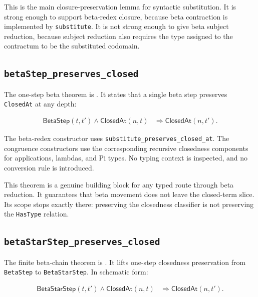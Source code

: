 This is the main closure-preservation lemma for syntactic substitution. It is
strong enough to support beta-redex closure, because beta contraction is
implemented by \texttt{substitute}. It is not strong enough to give beta
subject reduction, because subject reduction also requires the type assigned to
the contractum to be the substituted codomain.

\subsection{\texttt{betaStep\_preserves\_closed}}
\label{subsec:metacic-closure-preservation-audit-map-beta-step}

The one-step beta theorem is
.
It states that a single beta step preserves \texttt{ClosedAt} at any depth:

$$
\begin{aligned}
  \mathsf{BetaStep}(t,t')
  \wedge
  \mathsf{ClosedAt}(n,t)
  &\Rightarrow
  \mathsf{ClosedAt}(n,t').
\end{aligned}
$$

The beta-redex constructor uses
\texttt{substitute\_preserves\_closed\_at}. The congruence constructors use
the corresponding recursive closedness components for applications, lambdas,
and Pi types. No typing context is inspected, and no conversion rule is
introduced.

This theorem is a genuine building block for any typed route through beta
reduction. It guarantees that beta movement does not leave the closed-term
slice. Its scope stops exactly there: preserving the closedness classifier is
not preserving the \texttt{HasType} relation.

\subsection{\texttt{betaStarStep\_preserves\_closed}}
\label{subsec:metacic-closure-preservation-audit-map-beta-star-step}

The finite beta-chain theorem is
.
It lifts one-step closedness preservation from \texttt{BetaStep} to
\texttt{BetaStarStep}. In schematic form:

$$
\begin{aligned}
  \mathsf{BetaStarStep}(t,t')
  \wedge
  \mathsf{ClosedAt}(n,t)
  &\Rightarrow
  \mathsf{ClosedAt}(n,t').
\end{aligned}
$$

